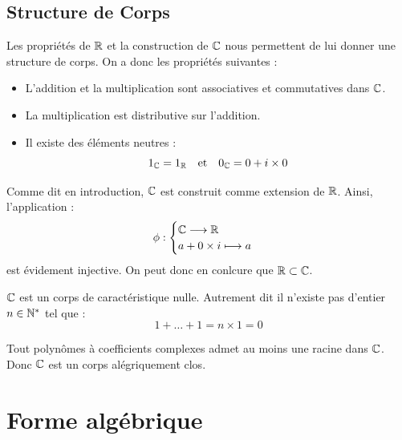 \subsection{Structure de Corps}

\begin{proposition}
    Les propriétés de $\mathbb{R}$ et la construction de $\mathbb{C}$ nous permettent de lui donner une structure de corps. 
    On a donc les propriétés suivantes : 
    \begin{itemize}
        \item L'addition et la multiplication sont associatives et commutatives dans $\mathbb{C}$. 
        \item La multiplication est distributive sur l'addition. 
        \item Il existe des éléments neutres : 
            \[ 1_{\mathbb{C}} = 1_{\mathbb{R}} \quad \text{et} \quad 0_{\mathbb{C}} = 0 + i \times 0 \] 
    \end{itemize}
\end{proposition}

\begin{remark}
    Comme dit en introduction, $\mathbb{C}$ est construit comme extension de $\mathbb{R}$. 
    Ainsi, l'application : 
        \[ \phi : 
            \begin{cases}
                \mathbb{C} \longrightarrow \mathbb{R} \\ 
                a + 0 \times i \longmapsto a 
            \end{cases} \]
    est évidement injective. On peut donc en conlcure que $\mathbb{R} \subset \mathbb{C}$. 
\end{remark}

\begin{proposition}
    $\mathbb{C}$ est un corps de caractéristique nulle. Autrement dit il n'existe pas d'entier $ n \in \mathbb{N}^*$ tel que :
        \[ 1 + \dots + 1 = n \times 1 = 0 \]
\end{proposition}


\begin{theorem}
    Tout polynômes à coefficients complexes admet au moins une racine dans $\mathbb{C}$. 
    Donc $\mathbb{C}$ est un corps alégriquement clos.
\end{theorem}



\section{Forme algébrique}

